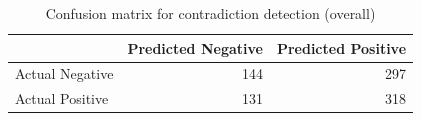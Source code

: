 \begin{table}
\caption{Confusion matrix for contradiction detection (overall)}
\label{tab:confusion_matrix}
\begin{tabular}{lrr}
\toprule
 & Predicted Negative & Predicted Positive \\
\midrule
Actual Negative & 144 & 297 \\
Actual Positive & 131 & 318 \\
\bottomrule
\end{tabular}
\end{table}
